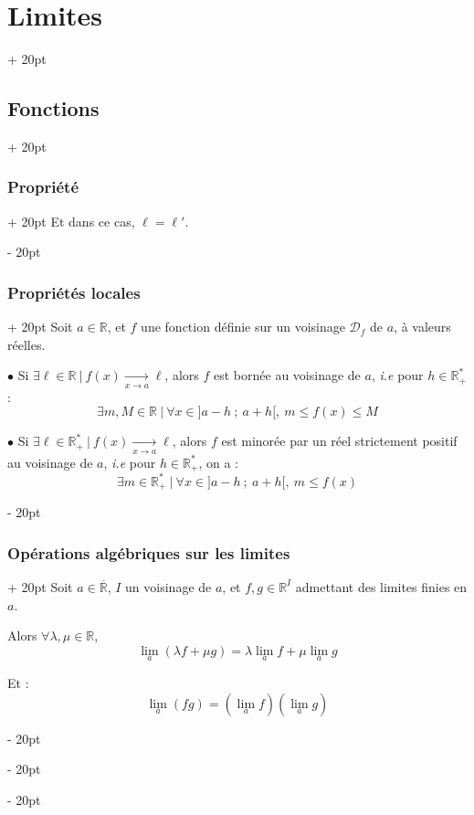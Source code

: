 \documentclass[a4paper, 12pt, twoside]{article}
\newcommand{\R}{\mathbb{R}} %
\newcommand{\cj}[1]{\overline{#1}} %
\newcommand{\tendsto}[1]{\xrightarrow[#1]{}}
\renewcommand{\le}{\leqslant}
\newcommand{\ind}[1][20pt]{\advance\leftskip + #1}
\newcommand{\deind}[1][20pt]{\advance\leftskip - #1}
\newenvironment{indt}[2][20pt]{#2 \par \ind[#1]}{\par \deind} %
\begin{document}
\begin{indt}{\section{Limites}}
\begin{indt}{\subsection{Fonctions}}
\begin{indt}{\subsubsection{Propriété}}
                Et dans ce cas, $\ell = \ell'$.
            \end{indt}

            \vspace{12pt}
            
            \begin{indt}{\subsubsection{Propriétés locales}}
                Soit $a \in \R$, et $f$ une fonction définie sur un voisinage $\mathcal D_f$ de $a$, à valeurs réelles.

                \vspace{6pt}
                
                $\bullet$ Si $\exists \ell \in \R\ |\ f(x) \tendsto{x \to a} \ell$, alors $f$ est bornée au voisinage de $a$, \textit{i.e} pour $h \in \R_+^*$ :
                \[
                    \exists m, M \in \R\ |\
                    \forall x \in ]a - h\ ;\ a + h[,\
                    m \le f(x) \le M
                \]

                \vspace{6pt}
                
                $\bullet$ Si $\exists \ell \in \R_+^*\ |\ f(x) \tendsto{x \to a} \ell$, alors $f$ est minorée par un réel strictement positif au voisinage de $a$, \textit{i.e} pour $h \in \R_+^*$, on a :
                \[
                    \exists m \in \R_+^*\ |\ \forall x \in ]a - h\ ;\ a + h[,\ m \le f(x)
                \]
            \end{indt}

            \vspace{12pt}
            
            \begin{indt}{\subsubsection{Opérations algébriques sur les limites}}
                Soit $a \in \cj \R$, $I$ un voisinage de $a$, et $f, g \in \R^I$ admettant des limites finies en $a$.

                Alors $\forall \lambda, \mu \in \R$,
                \[
                    \lim_a(\lambda f + \mu g) = \lambda \lim_a f + \mu \lim_a g
                \]

                Et :
                \[
                    \lim_a(fg) = (\lim_a f) (\lim_a g)
                \]


\end{indt}
\end{indt}
\end{indt}
\end{document}
